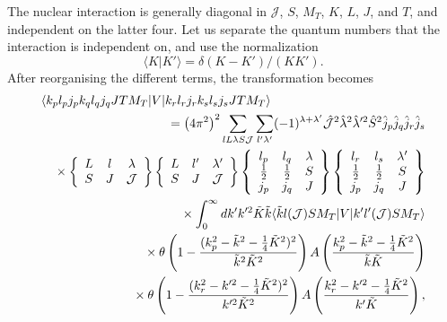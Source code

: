 \documentclass[a4paper,12pt]{report}
\begin{document}
The nuclear interaction is generally diagonal in $\mathcal{J}$, 
$S$, $M_{T}$, $K$, $L$, $J$, and $T$, and independent on
the latter four. Let us separate the quantum numbers that the
interaction is independent on, and use the normalization 
\[
\langle K|K'\rangle = \delta(K-K')/(KK'). 
\]
After reorganising the different terms, the transformation 
becomes
\begin{eqnarray} \label{eq:int_v_relcm2lab3}
  \lefteqn{  \langle k_{p}l_{p}j_{p}k_{q}l_{q}j_{q}JTM_{T}|
  V|k_{r}l_{r}j_{r}k_{s}l_{s}j_{s}JTM_{T}\rangle } \nonumber \\
  & & {} = \left(4\pi^{2}\right)^{2} \sum_{l L \lambda S \mathcal{J}}
  \sum_{l' \lambda' } (-1)^{\lambda + \lambda'}
  \hat{\mathcal{J}}^{2}\hat{\lambda }^{2}\hat{\lambda }'^{2} 
  \hat{S}^{2} \hat{j}_{p}\hat{j}_{q}\hat{j}_{r}\hat{j}_{s} 
  \nonumber \\
  & & {} \times \left\{ 
  \begin{array}{ccc}
    L & l & \lambda \\
    S & J & \mathcal{J} 
  \end{array} \right\}
   \left\{ \begin{array}{ccc}
    L & l' & \lambda' \\
    S & J & \mathcal{J} 
  \end{array} \right\}
   \left\{ \begin{array}{ccc}
    l_{p} & l_{q} & \lambda \\
    \frac{1}{2} & \frac{1}{2} & S \\
    j_{p} & j_{q} & J 
  \end{array} \right\}   
  \left\{ \begin{array}{ccc}
    l_{r} & l_{s} & \lambda ' \\
    \frac{1}{2} & \frac{1}{2} & S \\
    j_{p} & j_{q} & J 
  \end{array} \right\} \nonumber \\
  & & {} \times  \int_{0}^{\infty }dk' k'^{2}
  \tilde{K}\tilde{k} 
  \langle \tilde{k}l(\mathcal{J})SM_{T}|V|
  k'l'(\mathcal{J})SM_{T}\rangle \nonumber \\
  & & {} \times \theta \left( 1-\frac{(k_{p}^{2}
    -\tilde{k}^{2}-\frac{1}{4}\tilde{K}^{2})^{2}}
  {\tilde{k}^{2}\tilde{K}^{2}}\right)A
  \left( \frac{k_{p}^{2}-\tilde{k}^{2}-\frac{1}{4}
    \tilde{K}^{2}}{\tilde{k}\tilde{K}}\right) \nonumber \\
  & & {} \times \theta \left( 1-\frac{(k_{r}^{2}-k'^{2}
    -\frac{1}{4}\tilde{K}^{2})^{2}}{k'^{2}\tilde{K}^{2}}
  \right) A\left( \frac{k_{r}^{2}-k'^{2}
    -\frac{1}{4}\tilde{K}^{2}}{k'\tilde{K}}\right),
\end{eqnarray} 
\end{document}
